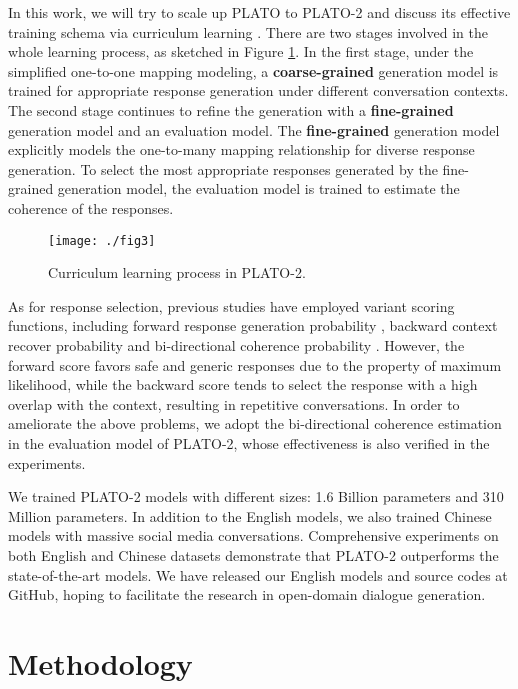 \documentclass[11pt,a4paper]{article}
\begin{document}
	In this work, we will try to scale up PLATO to PLATO-2 and discuss its effective training schema via curriculum learning \cite{bengio2009curriculum}. There are two stages involved in the whole learning process, as sketched in Figure \ref{fig:overview}. In the first stage, under the simplified one-to-one mapping modeling, a \textbf{coarse-grained} generation model is trained for appropriate response generation 
	under different conversation contexts. The second stage continues to refine the generation with a \textbf{fine-grained} generation model and an evaluation model. The \textbf{fine-grained} generation model explicitly models the one-to-many mapping relationship for diverse response generation. To select the most appropriate responses generated by the fine-grained generation model, the evaluation model is trained to estimate the coherence of the responses.
	\begin{figure}
		\centering
		\texttt{[image: ./fig3]}
		\caption{Curriculum learning process in PLATO-2.}
		\label{fig:overview}
	\end{figure} 
	
	As for response selection, previous studies have employed variant scoring functions, including forward response generation probability \cite{adiwardana2020towards}, backward context recover probability \cite{zhang2019dialogpt} and bi-directional coherence probability \cite{bao2019plato}. However, the forward score favors safe and generic responses due to the property of maximum likelihood, while the backward score tends to select the response with a high overlap with the context, resulting in repetitive conversations. In order to ameliorate the above problems, we adopt the bi-directional coherence estimation in the evaluation model of PLATO-2, whose effectiveness is also verified in the experiments.
	
	We trained PLATO-2 models with different sizes: 1.6 Billion parameters and 310 Million parameters. In addition to the English models, we also trained Chinese models with massive social media conversations. Comprehensive experiments on both English and Chinese datasets demonstrate that PLATO-2 outperforms the state-of-the-art models. We have released our English models and source codes at GitHub, hoping to facilitate the research in open-domain dialogue generation.\footnotemark[1]
	
	\section{Methodology}
\end{document}
